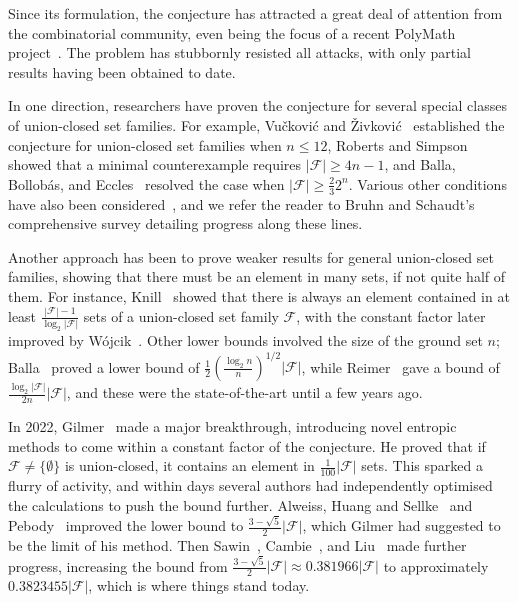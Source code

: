 \documentclass[a4paper,12pt]{article}
\theoremstyle{mystyle}	%
\theoremstyle{definition}
\newcommand{\F}{\mathcal{F}}
\newcommand{\6}{\partial}
\begin{document}
Since its formulation, the conjecture has attracted a great deal of attention from the combinatorial community, even being the focus of a recent PolyMath project~\cite{PolyMath}. The problem has stubbornly resisted all attacks, with only partial results having been obtained to date.

In one direction, researchers have proven the conjecture for several special classes of union-closed set families. For example, Vu\v{c}kovi\'{c} and \v{Z}ivkovi\'{c}~\cite{vuckovic201712case} established the conjecture for union-closed set families when $n \le 12$, Roberts and Simpson~\cite{MR2662546} showed that a minimal counterexample requires $|\F| \ge 4n -1$, and Balla, Bollob\'as, and Eccles~\cite{MR3007135} resolved the case when $|\F| \ge \frac23 2^n$. Various other conditions have also been considered~\cite{MR4245296, MR3266293, MR2199779, MR1750455, MR1932685}, and we refer the reader to Bruhn and Schaudt's~\cite{MR3417215} comprehensive survey detailing progress along these lines.

Another approach has been to prove weaker results for general union-closed set families, showing that there must be an element in many sets, if not quite half of them. For instance, Knill~\cite{knill1994graph} showed that there is always an element contained in at least $\frac{|\mathcal{F}|-1}{\log_2|\mathcal{F}|}$ sets of a union-closed set family $\mathcal{F}$, with the constant factor later improved by W\'ojcik~\cite{MR1675919}. Other lower bounds involved the size of the ground set $n$; Balla~\cite{balla2011minimum} proved a lower bound of $\frac1{2} \left(\frac{\log_2n}{n} \right)^{1/2}|\mathcal{F}|$, while Reimer~\cite{MR1967488} gave a bound of $\frac{\log_2 |\mathcal{F}|}{2n} |\mathcal{F}|$, and these were the state-of-the-art until a few years ago.

In 2022, Gilmer~\cite{gilmer2022constant} made a major breakthrough, introducing novel entropic methods to come within a constant factor of the conjecture. He proved that if $\mathcal{F} \neq \{\emptyset\}$ is union-closed, it contains an element in $\tfrac{1}{100}|\mathcal{F}|$ sets. This sparked a flurry of activity, and within days several authors had independently optimised the calculations to push the bound further. Alweiss, Huang and Sellke~\cite{alweiss2022improved} and Pebody~\cite{pebody2022extension} improved the lower bound to $\frac{3-\sqrt{5}}{2}|\mathcal{F}|$, which Gilmer had suggested to be the limit of his method. Then Sawin~\cite{sawin2023improved}, Cambie~\cite{cambie2022better}, and Liu~\cite{liu2023improving} made further progress, increasing the bound from $\frac{3-\sqrt{5}}{2}|\mathcal{F}|\approx 0.381966 |\mathcal{F}|$ to approximately $0.3823455|\mathcal{F}|$, which is where things stand today. 
    
\end{document}
